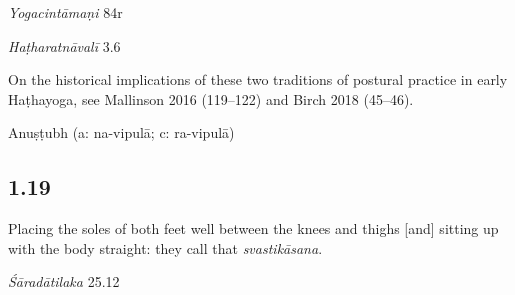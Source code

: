 \begin{ekdosis}
\begin{testimonia}[hp01_018]
\emph{Yogacintāmaṇi} 84r

\begin{versinnote}
\end{versinnote}

\emph{Haṭharatnāvalī} 3.6

\begin{versinnote}
\end{versinnote}

\end{testimonia}

\begin{philcomm}[hp01_018]        
On the historical implications of these two traditions of postural practice in early Haṭhayoga, see Mallinson 2016 (119–122) and Birch 2018 (45–46).
\end{philcomm}

\begin{metre}[hp01_018]
Anuṣṭubh (a: na-vipulā; c: ra-vipulā)
\end{metre}

\subsection*{1.19}
\begin{translation}[hp01_019]
Placing the soles of both feet well between the knees and thighs [and] sitting up with the body straight: they call that \emph{svastikāsana}.%
\end{translation}

\begin{sources}[hp01_019]
\emph{Śāradātilaka} 25.12


\end{sources}
\end{ekdosis}
